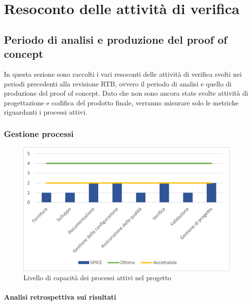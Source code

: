 \appendix
\section{Resoconto delle attività di verifica}
\subsection{Periodo di analisi e produzione del proof of concept}
In questa sezione sono raccolti i vari resoconti delle attività di verifica svolti nei periodi precedenti alla revisione RTB, ovvero il periodo di analisi e quello di produzione del proof of concept.
Dato che non sono ancora state svolte attività di progettazione e codifica del prodotto finale, verranno misurare solo le metriche riguardanti i processi attivi.
\subsubsection{Gestione processi}
\begin{figure}[H]
	\centering
	\includegraphics[scale=1.1]{img/SPICE.png}
	\caption{Livello di capacità dei processi attivi nel progetto}
\end{figure}
\paragraph{Analisi retrospettiva sui risultati}
